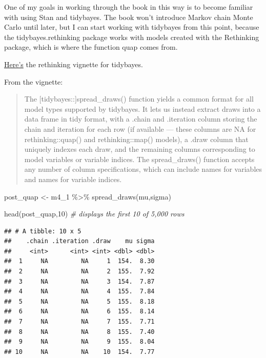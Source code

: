 \documentclass[
]{book}
\newenvironment{Shaded}{\begin{snugshade}}{\end{snugshade}}
\newcommand{\CommentTok}[1]{\textcolor[rgb]{0.56,0.35,0.01}{\textit{#1}}}
\newcommand{\DecValTok}[1]{\textcolor[rgb]{0.00,0.00,0.81}{#1}}
\newcommand{\FunctionTok}[1]{\textcolor[rgb]{0.00,0.00,0.00}{#1}}
\newcommand{\NormalTok}[1]{#1}
\newcommand{\OtherTok}[1]{\textcolor[rgb]{0.56,0.35,0.01}{#1}}
\newcommand{\SpecialCharTok}[1]{\textcolor[rgb]{0.00,0.00,0.00}{#1}}
\begin{document}
One of my goals in working through the book in this way is to become familiar with using Stan and tidybayes. The book won't introduce Markov chain Monte Carlo until later, but I can start working with tidybayes from this point, because the tidybayes.rethinking package works with models created with the Rethinking package, which is where the function quap comes from.

\href{https://mjskay.github.io/tidybayes.rethinking/articles/tidy-rethinking.html}{Here's} the rethinking vignette for tidybayes.

From the vignette:

\begin{quote}
The {[}tidybayes::{]}spread\_draws() function yields a common format for all model types supported by tidybayes. It lets us instead extract draws into a data frame in tidy format, with a .chain and .iteration column storing the chain and iteration for each row (if available --- these columns are NA for rethinking::quap() and rethinking::map() models), a .draw column that uniquely indexes each draw, and the remaining columns corresponding to model variables or variable indices. The spread\_draws() function accepts any number of column specifications, which can include names for variables and names for variable indices.
\end{quote}

\begin{Shaded}
\begin{Highlighting}[]
\NormalTok{post\_quap }\OtherTok{\textless{}{-}}\NormalTok{ m4\_1 }\SpecialCharTok{\%\textgreater{}\%}
  \FunctionTok{spread\_draws}\NormalTok{(mu,sigma)}

\FunctionTok{head}\NormalTok{(post\_quap,}\DecValTok{10}\NormalTok{) }\CommentTok{\# displays the first 10 of 5,000 rows}
\end{Highlighting}
\end{Shaded}

\begin{verbatim}
## # A tibble: 10 x 5
##    .chain .iteration .draw    mu sigma
##     <int>      <int> <int> <dbl> <dbl>
##  1     NA         NA     1  154.  8.30
##  2     NA         NA     2  155.  7.92
##  3     NA         NA     3  154.  7.87
##  4     NA         NA     4  155.  7.84
##  5     NA         NA     5  155.  8.18
##  6     NA         NA     6  155.  8.14
##  7     NA         NA     7  155.  7.71
##  8     NA         NA     8  155.  7.40
##  9     NA         NA     9  155.  8.04
## 10     NA         NA    10  154.  7.77
\end{verbatim}
\end{document}
